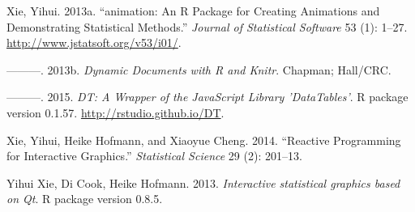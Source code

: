 \documentclass[12pt,]{isuthesis}
\begin{document}
\hypertarget{ref-animation}{}
Xie, Yihui. 2013a. ``animation: An R Package for Creating Animations and
Demonstrating Statistical Methods.'' \emph{Journal of Statistical
Software} 53 (1): 1--27. \url{http://www.jstatsoft.org/v53/i01/}.

\hypertarget{ref-knitr}{}
---------. 2013b. \emph{Dynamic Documents with R and Knitr}. Chapman;
Hall/CRC.

\hypertarget{ref-DT}{}
---------. 2015. \emph{DT: A Wrapper of the JavaScript Library
'DataTables'}. R package version 0.1.57.
\url{http://rstudio.github.io/DT}.

\hypertarget{ref-Xie:2014co}{}
Xie, Yihui, Heike Hofmann, and Xiaoyue Cheng. 2014. ``Reactive
Programming for Interactive Graphics.'' \emph{Statistical Science} 29
(2): 201--13.

\hypertarget{ref-cranvas}{}
Yihui Xie, Di Cook, Heike Hofmann. 2013. \emph{Interactive statistical
graphics based on Qt}. R package version 0.8.5.

%
\end{document}
